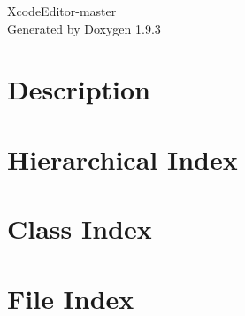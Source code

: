 \documentclass[twoside]{book}
\newcommand{\+}{\discretionary{\mbox{\scriptsize$\hookleftarrow$}}{}{}}
\newcommand{\clearemptydoublepage}{%
    \newpage{\pagestyle{empty}\cleardoublepage}%
  }
\begin{document}
  \raggedbottom
    \hypersetup{pageanchor=false,
                bookmarksnumbered=true,
                pdfencoding=unicode
               }
  \begin{titlepage}
  \vspace*{7cm}
  \begin{center}%
  {\Large Xcode\+Editor-\/master}\\
  \vspace*{1cm}
  {\large Generated by Doxygen 1.9.3}\\
  \end{center}
  \end{titlepage}
  \clearemptydoublepage
  \tableofcontents
  \clearemptydoublepage
  \hypersetup{pageanchor=true}
\chapter{Description}
\label{md__r_e_a_d_m_e}

\chapter{Hierarchical Index}

\chapter{Class Index}

\chapter{File Index}

\end{document}
